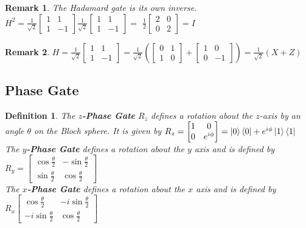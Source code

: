 \documentclass[12pt,twoside,fleqn]{report}
\theoremstyle{thmstyle}
\newtheorem{defn}{Definition}[chapter]
\newtheorem{remark}{Remark}[chapter]
\begin{document}
\begin{remark}
    The Hadamard gate is its own inverse.\\
    $H^2 = \frac{1}{\sqrt{2}} \begin{bmatrix} 1 & 1 \\ 1 & -1 \end{bmatrix} \frac{1}{\sqrt{2}} \begin{bmatrix} 1 & 1 \\ 1 & -1 \end{bmatrix} = $
    $\frac{1}{2} \begin{bmatrix}2 & 0 \\ 0 & 2 \end{bmatrix} = I$
\end{remark}
\begin{remark}
    $H =   \frac{1}{\sqrt{2}} \begin{bmatrix} 1 & 1 \\ 1 & -1 \end{bmatrix} = \frac{1}{\sqrt{2}} \left( \begin{bmatrix} 0 & 1 \\ 1 & 0 \end{bmatrix}  + \begin{bmatrix} 1 & 0 \\ 0 & -1 \end{bmatrix} \right) = \frac{1}{\sqrt{2}} (X + Z)$
\end{remark}

\subsection{Phase Gate}
\begin{defn}
    The \textbf{$z$-Phase Gate} $R_z$ defines a rotation about the $z$-axis by an angle $\theta$ on the Bloch sphere.
    It is given by $R_z= \begin{bmatrix} 1 & 0 \\ 0 & e^{i\phi} \end{bmatrix} = \ket{0}\bra{0} + e^{i\phi} \ket{1}\bra{1}$ \\

    The \textbf{$y$-Phase Gate} defines a rotation about the $y$ axis and is defined by \\
    $R_y = \begin{bmatrix} \cos \frac{\theta}{2} & - \sin \frac{\theta}{2} \\ \sin \frac{\theta}{2} & \cos \frac{\theta}{2} \end{bmatrix}$ \\
    The \textbf{$x$-Phase Gate} defines a rotation about the $x$ axis and is defined by \\
    $R_x \begin{bmatrix} \cos \frac{\theta}{2} & - i \sin \frac{\theta}{2} \\ - i \sin \frac{\theta}{2} & \cos \frac{\theta}{2} \end{bmatrix}$
\end{defn}
\end{document}

